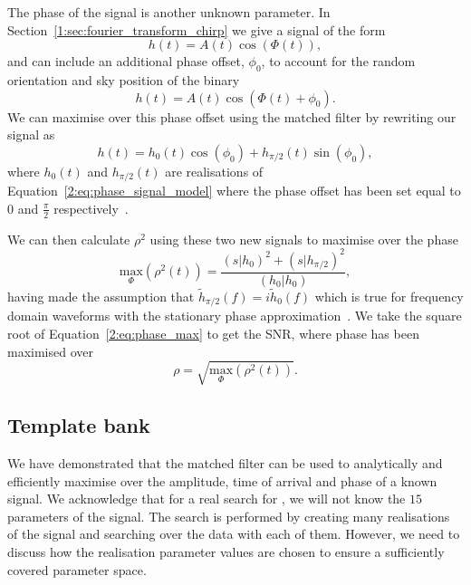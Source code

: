 The phase of the \gwadj signal is another unknown parameter. In Section~\ref{1:sec:fourier_transform_chirp} we give a signal of the form
%
\begin{equation}
    h(t) = A(t) \cos\left(\Phi(t)\right),
\end{equation}
%
and can include an additional phase offset, $\phi_{0}$, to account for the random orientation and sky position of the binary
%
\begin{equation}
    h(t) = A(t) \cos\left(\Phi(t) + \phi_{0}\right).
    \label{2:eq:phase_signal_model}
\end{equation}
%
We can maximise over this phase offset using the matched filter by rewriting our signal as
%
\begin{equation}
    h(t) = h_{0}(t) \cos(\phi_{0}) + h_{\pi/2}(t)\sin(\phi_{0}),
\end{equation}
%
where $h_{0}(t)$ and $h_{\pi/2}(t)$ are realisations of Equation~\ref{2:eq:phase_signal_model} where the phase offset has been set equal to $0$ and $\frac{\pi}{2}$ respectively~\cite{IHOPE:2012zx}.

We can then calculate $\rho^{2}$ using these two new signals to maximise over the phase
%
\begin{equation}
    \underset{\Phi}{\text{max}}(\rho^{2}(t)) = \frac{(s|h_{0})^{2} + (s|h_{\pi/2})^2}{(h_{0}|h_{0})},
    \label{2:eq:phase_max}
\end{equation}
%
having made the assumption that $\tilde{h}_{\pi/2}(f) = i\tilde{h}_{0}(f)$ which is true for frequency domain waveforms with the stationary phase approximation~\cite{Droz:1999}. We take the square root of Equation~\ref{2:eq:phase_max} to get the SNR, where phase has been maximised over
\begin{equation}
    \rho = \sqrt{\underset{\Phi}{\text{max}}(\rho^{2}(t))}.
\end{equation}

\subsection{\label{2:sec:template-bank}Template bank}

We have demonstrated that the matched filter can be used to analytically and efficiently maximise over the amplitude, time of arrival and phase of a known signal. We acknowledge that for a real search for \gws, we will not know the $15$ parameters of the signal. The search is performed by creating many realisations of the \gwadj signal and searching over the data with each of them. However, we need to discuss how the realisation parameter values are chosen to ensure a sufficiently covered parameter space.

